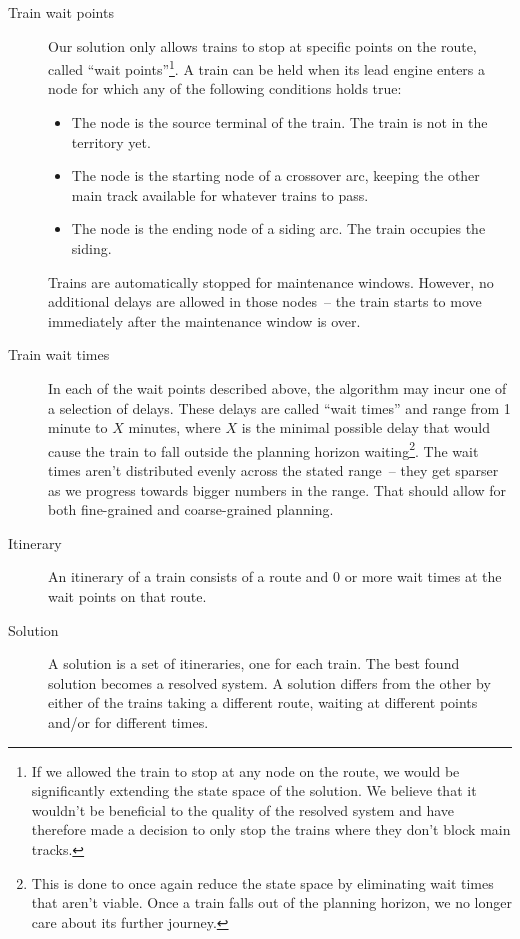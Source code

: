 \documentclass[10pt,a4paper,final]{article}
\begin{document}
\begin{description}
\item[Train wait points] Our solution only allows trains to stop at specific points on the route, called ``wait points''\footnote{If we allowed the train to stop at any node on the route, we would be significantly extending the state space of the solution. We believe that it wouldn't be beneficial to the quality of the resolved system and have therefore made a decision to only stop the trains where they don't block main tracks.}. A train can be held when its lead engine enters a node for which any of the following conditions holds true:

\begin{itemize}
\item The node is the source terminal of the train. The train is not in the territory yet.
\item The node is the starting node of a crossover arc, keeping the other main track available for whatever trains to pass.
\item The node is the ending node of a siding arc. The train occupies the siding.
\end{itemize}

Trains are automatically stopped for maintenance windows. However, no additional delays are allowed in those nodes~-- the train starts to move immediately after the maintenance window is over.

\item[Train wait times] In each of the wait points described above, the algorithm may incur one of a selection of delays. These delays are called ``wait times'' and range from 1 minute to $X$ minutes, where $X$ is the minimal possible delay that would cause the train to fall outside the planning horizon waiting\footnote{This is done to once again reduce the state space by eliminating wait times that aren't viable. Once a train falls out of the planning horizon, we no longer care about its further journey.}. The wait times aren't distributed evenly across the stated range~-- they get sparser as we progress towards bigger numbers in the range. That should allow for both fine-grained and coarse-grained planning.

\item[Itinerary] An itinerary of a train consists of a route and 0 or more wait times at the wait points on that route.

\item[Solution] A solution is a set of itineraries, one for each train. The best found solution becomes a resolved system. A solution differs from the other by either of the trains taking a different route, waiting at different points and/or for different times.

\end{description}
\end{document}
